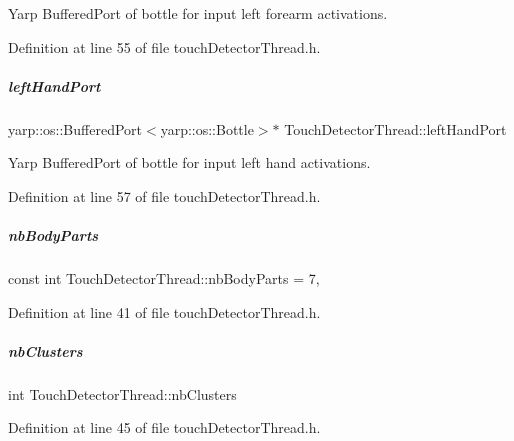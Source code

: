 Yarp Buffered\+Port of bottle for input left forearm activations. 



Definition at line 55 of file touch\+Detector\+Thread.\+h.

\mbox{\label{group__touchDetector_a6b373d5f8e235c68ce5526909c44074f}} 
\subparagraph{\texorpdfstring{left\+Hand\+Port}{leftHandPort}}
{\footnotesize\ttfamily yarp\+::os\+::\+Buffered\+Port$<$yarp\+::os\+::\+Bottle$>$$\ast$ Touch\+Detector\+Thread\+::left\+Hand\+Port\hspace{0.3cm}{\ttfamily [protected]}}



Yarp Buffered\+Port of bottle for input left hand activations. 



Definition at line 57 of file touch\+Detector\+Thread.\+h.

\mbox{\label{group__touchDetector_af2e69c2ccd1b3a837c6c2647f830377f}} 
\subparagraph{\texorpdfstring{nb\+Body\+Parts}{nbBodyParts}}
{\footnotesize\ttfamily const int Touch\+Detector\+Thread\+::nb\+Body\+Parts = 7\hspace{0.3cm}{\ttfamily [static]}, {\ttfamily [protected]}}



Definition at line 41 of file touch\+Detector\+Thread.\+h.

\mbox{\label{group__touchDetector_aa04ee21c0927d0520223ecd59be4fd29}} 
\subparagraph{\texorpdfstring{nb\+Clusters}{nbClusters}}
{\footnotesize\ttfamily int Touch\+Detector\+Thread\+::nb\+Clusters\hspace{0.3cm}{\ttfamily [protected]}}



Definition at line 45 of file touch\+Detector\+Thread.\+h.

